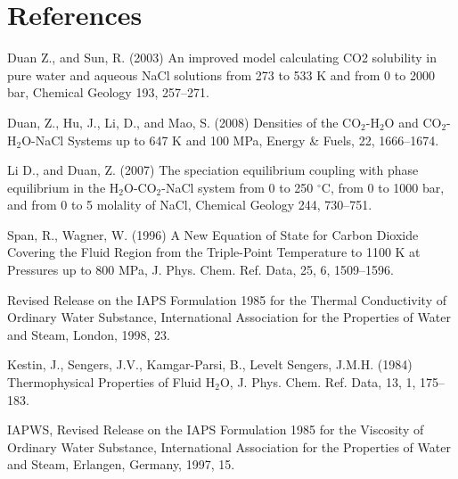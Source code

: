 \documentclass[12pt]{article}
\begin{document}
\section{References}
\begin{description}
\item Duan Z., and Sun, R. (2003) An improved model calculating CO2 solubility in pure water and aqueous NaCl solutions from 273 to 533 K and from 0 to 2000 bar, Chemical Geology 193, 257--271.

\item Duan, Z., Hu, J., Li, D., and Mao, S. (2008) Densities of the CO$_2$-H$_2$O and CO$_2$-H$_2$O-NaCl Systems up to 647 K and 100 MPa, Energy \& Fuels, 22, 1666--1674.

\item Li D., and Duan, Z. (2007) The speciation equilibrium coupling with phase equilibrium in the H$_2$O-CO$_2$-NaCl system from 0 to 250 $^\circ$C, from 0 to 1000 bar, and from 0 to 5 molality of NaCl, Chemical Geology 244, 730--751.

\item Span, R., Wagner, W. (1996) A New Equation of State for Carbon Dioxide Covering the Fluid Region from the Triple-Point Temperature to 1100 K at Pressures up to 800 MPa, J. Phys. Chem. Ref. Data, 25, 6, 1509--1596.

\item Revised Release on the IAPS Formulation 1985 for the Thermal Conductivity of Ordinary Water Substance, International Association for the Properties of Water and Steam, London, 1998, 23. 


\item Kestin, J., Sengers, J.V., Kamgar-Parsi, B., Levelt Sengers, J.M.H. (1984) Thermophysical Properties of Fluid H$_2$O, J. Phys. Chem. Ref. Data, 13, 1, 175--183.


\item IAPWS, Revised Release on the IAPS Formulation 1985 for the Viscosity of Ordinary Water Substance, International Association for the Properties of Water and Steam, Erlangen, Germany, 1997, 15.
\end{description}

%
%
\end{document}
